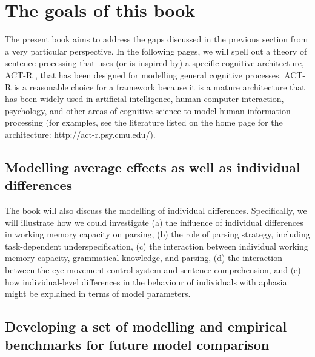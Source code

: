 \documentclass{cambridge7A}\usepackage[]{graphicx}\usepackage[]{color}
\begin{document}
\section{The goals of this book}

The present book aims to address the gaps discussed in the previous section from a very particular perspective.
In the following pages, we will spell out a theory of
sentence processing \citep{LewisVasishth2005} that uses (or is inspired by) a specific cognitive
architecture,  ACT-R \citep{AndersonEtAl2004}, that has been designed for
modelling general cognitive processes. ACT-R is a reasonable choice
for a framework because it is a mature architecture that has been
widely used in artificial intelligence, human-computer interaction,
psychology, and other areas of cognitive science to model human
information processing (for examples, see the literature listed on the home page for the architecture: http://act-r.psy.cmu.edu/). 



\subsection{Modelling average effects as well as individual differences}

The book will also discuss the modelling of individual differences. Specifically, we will illustrate how we could investigate (a) 
the influence of individual differences in  working memory capacity on parsing, (b) the role of parsing strategy, including task-dependent underspecification,  (c) the interaction between individual working memory capacity, grammatical knowledge, and parsing, (d) the interaction between the eye-movement control system and sentence comprehension, and (e) how individual-level differences in the behaviour of individuals with aphasia might be explained in terms of model parameters. 

\subsection{Developing a set of modelling and empirical benchmarks for future model comparison}
\end{document}
